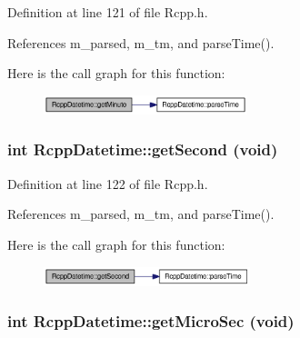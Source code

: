 Definition at line 121 of file Rcpp.h.

References m\_\-parsed, m\_\-tm, and parseTime().

Here is the call graph for this function:\nopagebreak
\begin{figure}[H]
\begin{center}
\leavevmode
\includegraphics[width=168pt]{classRcppDatetime_db41bd524ead66d69e129b1f2767358a_cgraph}
\end{center}
\end{figure}
\hypertarget{classRcppDatetime_2feb900005890d183cc5f6a626c4d614}{
\subsubsection[getSecond]{\setlength{\rightskip}{0pt plus 5cm}int RcppDatetime::getSecond (void)}}
\label{classRcppDatetime_2feb900005890d183cc5f6a626c4d614}




Definition at line 122 of file Rcpp.h.

References m\_\-parsed, m\_\-tm, and parseTime().

Here is the call graph for this function:\nopagebreak
\begin{figure}[H]
\begin{center}
\leavevmode
\includegraphics[width=170pt]{classRcppDatetime_2feb900005890d183cc5f6a626c4d614_cgraph}
\end{center}
\end{figure}
\hypertarget{classRcppDatetime_cdf9e19f28c84fde38c352df5f225999}{
\subsubsection[getMicroSec]{\setlength{\rightskip}{0pt plus 5cm}int RcppDatetime::getMicroSec (void)}}
\label{classRcppDatetime_cdf9e19f28c84fde38c352df5f225999}




